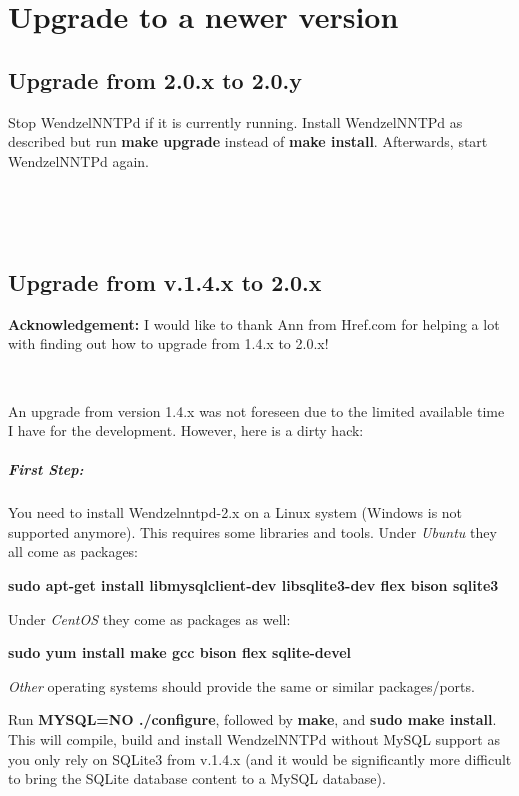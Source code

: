 \chapter{Upgrade to a newer version}\label{Ch:Upgrade}

\section{Upgrade from 2.0.x to 2.0.y}

Stop WendzelNNTPd if it is currently running. Install WendzelNNTPd as described but run {\bf make upgrade} instead of {\bf make install}. Afterwards, start WendzelNNTPd again.

~

~

\section{Upgrade from v.1.4.x to 2.0.x}

{\bf Acknowledgement:} I would like to thank Ann from Href.com for helping a lot with finding out how to upgrade from 1.4.x to 2.0.x!

~

An upgrade from version 1.4.x was not foreseen due to the limited available time I have for the development. However, here is a dirty hack:

\paragraph*{First Step:} You need to install Wendzelnntpd-2.x on a Linux system (Windows is not supported anymore). This requires some libraries and tools. Under {\it Ubuntu} they all come as packages:

{\bf sudo apt-get install libmysqlclient-dev libsqlite3-dev flex bison sqlite3}

Under {\it CentOS} they come as packages as well:

{\bf sudo yum install make gcc bison flex sqlite-devel}

{\it Other} operating systems should provide the same or similar packages/ports.

Run {\bf MYSQL=NO ./configure}, followed by {\bf make}, and {\bf sudo make install}. This will compile, build and install WendzelNNTPd without MySQL support as you only rely on SQLite3 from v.1.4.x (and it would be significantly more difficult to bring the SQLite database content to a MySQL database).

